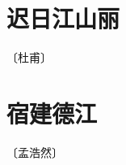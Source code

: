 \documentclass[12pt,UTF-8,openany]{ctexbook}
\begin{document}
\vspace{8pt}


\section{迟日江山丽}

\begin{center}
    \vspace{10pt}
    
    \begin{normalsize}
        
        〔杜甫〕
        
    \end{normalsize}
    
    \vspace{8pt}
    
    \begin{large}
        
        
        
    \end{large}
    
\end{center}

\vspace{8pt}


\section{宿建德江}

\begin{center}
    \vspace{10pt}
    
    \begin{normalsize}
        
        〔孟浩然〕
        
    \end{normalsize}
    
    \vspace{8pt}
    
    \begin{large}
        
        
        
    \end{large}
    
\end{center}
\end{document}
